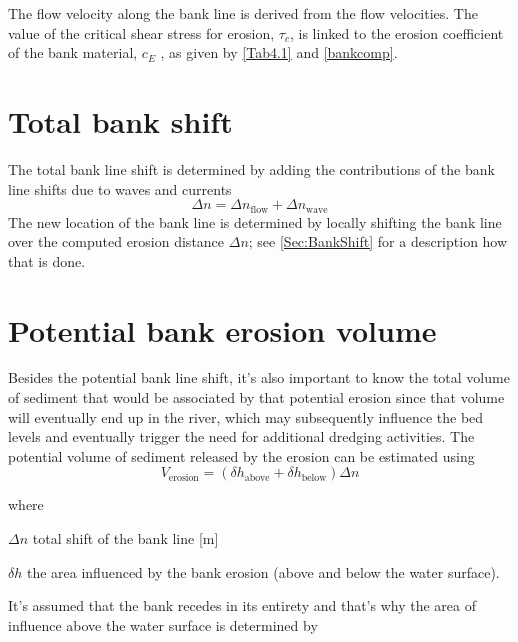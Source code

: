 The flow velocity along the bank line is derived from the \dflowfm flow velocities.
The value of the critical shear stress for erosion, $\tau_c$, is linked to the erosion coefficient of the bank material, $c_E$ , as given by \autoref{Tab4.1} and \autoref{bankcomp}.

\section{Total bank shift} \label{Sec4.3}

The total bank line shift is determined by adding the contributions of the bank line shifts due to waves and currents
%
\begin{equation}
\Delta n = \Delta n_\text{flow} + \Delta n_\text{wave}
\end{equation}
%
The new location of the bank line is determined by locally shifting the bank line over the computed erosion distance $\Delta n$; see \autoref{Sec:BankShift} for a description how that is done.

\section{Potential bank erosion volume} \label{Sec4.4}

Besides the potential bank line shift, it's also important to know the total volume of sediment that would be associated by that potential erosion since that volume will eventually end up in the river, which may subsequently influence the bed levels and eventually trigger the need for additional dredging activities.
The potential volume of sediment released by the erosion can be estimated using
%
\begin{equation}
V_\text{erosion} = ( \delta h_\text{above} + \delta h_\text{below} ) \Delta n
\end{equation}

where
\begin{symbollist}
	\item[$\Delta n$] total shift of the bank line [m]
	\item[$\delta h$] the area influenced by the bank erosion (above and below the water surface).
\end{symbollist}
It's assumed that the bank recedes in its entirety and that's why the area of influence above the water surface is determined by

